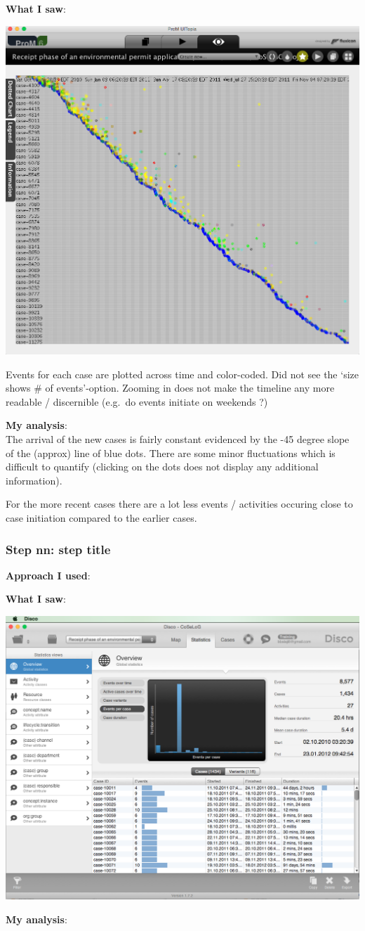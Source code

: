 \documentclass[]{article}
\begin{document}
\textbf{What I saw}:

\includegraphics{CoSeLoG_Step_04.png}

Events for each case are plotted across time and color-coded. Did not
see the `size shows \# of events'-option. Zooming in does not make the
timeline any more readable / discernible (e.g.~do events initiate on
weekends ?)

\textbf{My analysis}:\\The arrival of the new cases is fairly constant
evidenced by the -45 degree slope of the (approx) line of blue dots.
There are some minor fluctuations which is difficult to quantify
(clicking on the dots does not display any additional information).

For the more recent cases there are a lot less events / activities
occuring close to case initiation compared to the earlier cases.

\subsubsection{Step nn: step title}\label{step-nn-step-title}

\textbf{Approach I used}:

\textbf{What I saw}:

\includegraphics{dummy.png}

\textbf{My analysis}:
\end{document}
